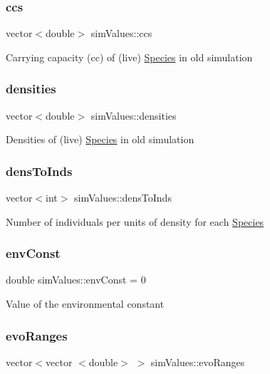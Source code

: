 \subsubsection{\texorpdfstring{ccs}{ccs}}
{\footnotesize\ttfamily vector$<$double$>$ sim\+Values\+::ccs}

Carrying capacity (cc) of (live) \hyperlink{classSpecies}{Species} in old simulation \mbox{\label{structsimValues_a14ed3f6bacb44ceb58b7929e90fe0516}} 
\subsubsection{\texorpdfstring{densities}{densities}}
{\footnotesize\ttfamily vector$<$double$>$ sim\+Values\+::densities}

Densities of (live) \hyperlink{classSpecies}{Species} in old simulation \mbox{\label{structsimValues_a658893629c5a789c447057da417e5096}} 
\subsubsection{\texorpdfstring{dens\+To\+Inds}{densToInds}}
{\footnotesize\ttfamily vector$<$int$>$ sim\+Values\+::dens\+To\+Inds}

Number of individuals per units of density for each \hyperlink{classSpecies}{Species} \mbox{\label{structsimValues_a0b3bdcfb8a911b35e71ab03aad776453}} 
\subsubsection{\texorpdfstring{env\+Const}{envConst}}
{\footnotesize\ttfamily double sim\+Values\+::env\+Const = 0}

Value of the environmental constant \mbox{\label{structsimValues_a5c4fa1fbabac24649729c3692bd2a59f}} 
\subsubsection{\texorpdfstring{evo\+Ranges}{evoRanges}}
{\footnotesize\ttfamily vector$<$vector $<$double$>$ $>$ sim\+Values\+::evo\+Ranges}

